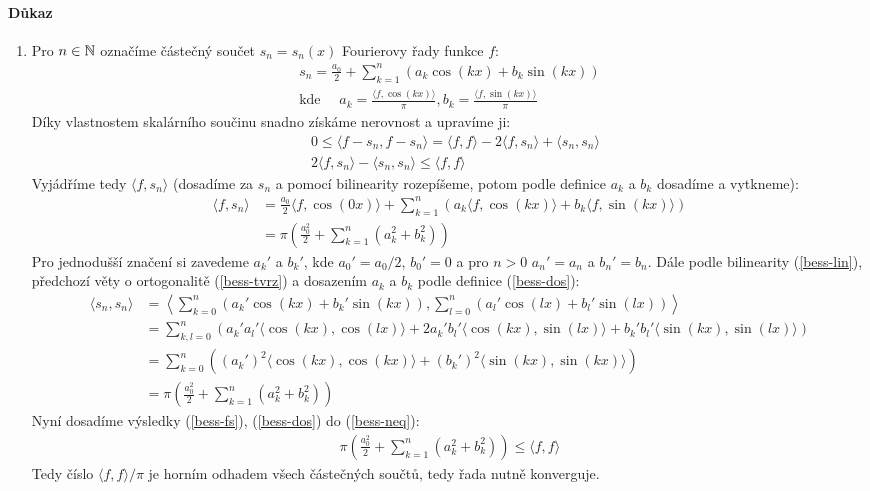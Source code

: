 \documentclass[a4paper,10pt]{article}
\begin{document}
\paragraph{Důkaz}
\begin{enumerate}
	\item Pro $n \in \mathbb{N}$ označíme částečný součet $s_n = s_n(x)$ Fourierovy řady
	funkce $f$:
	\begin{align}
		s_n = \frac{a_0}{2} + \sum_{k=1}^n(a_k \cos(kx) + b_k\sin(kx)) \\
		\text{kde }\quad  a_k = \frac{\langle f, \cos(kx)\rangle}{\pi}, 
		b_k = \frac{\langle f, \sin(kx)\rangle}{\pi}
	\end{align}
	Díky vlastnostem skalárního součinu snadno získáme nerovnost a
	upravíme ji:
	\begin{align}
		&0 \le \langle f - s_n, f - s_n \rangle = \langle f, f \rangle - 2
		\langle f, s_n \rangle + \langle s_n, s_n \rangle \\
		\label{bess-neq}
		&2 \langle f, s_n \rangle - \langle s_n, s_n \rangle \le \langle f, f
		\rangle
	\end{align}
	Vyjádříme tedy $\langle f, s_n \rangle$ (dosadíme za $s_n$ a pomocí
	bilinearity rozepíšeme, potom podle definice $a_k$ a $b_k$ dosadíme a vytkneme):
	\begin{align}
		\langle f, s_n \rangle &= \frac{a_0}{2} \langle f, \cos(0x) \rangle +
		\sum_{k=1}^n (a_k \langle f, \cos(kx) \rangle + b_k \langle f,
		\sin(kx)\rangle) \\
		\label{bess-fs}
		&= \pi \left( \frac{a_0^2}{2} + \sum_{k=1}^n(a_k^2 + b_k^2) \right)
	\end{align}
	Pro jednodušší značení si zavedeme $a_k'$ a $b_k'$, kde $a_0' = a_0 / 2$,
	$b_0' = 0$ a pro $n > 0$ $a_n' = a_n$ a $b_n' = b_n$. 
	Dále podle bilinearity (\ref{bess-lin}), předchozí věty o ortogonalitě
	(\ref{bess-tvrz}) a dosazením $a_k$ a $b_k$ podle definice (\ref{bess-dos}):
	\begin{align}
		\langle s_n, s_n \rangle &= \left\langle
			\sum_{k=0}^n(a_k' \cos(kx) + b_k' \sin(kx)),
			\sum_{l=0}^n(a_l' \cos(lx) + b_l' \sin(lx))
		\right\rangle \\
		\label{bess-lin}
		&= \sum_{k,l=0}^n(a_k'a_l' \langle\cos(kx), \cos(lx)\rangle +
		2a_k'b_l'\langle\cos(kx),\sin(lx)\rangle +
		b_k'b_l'\langle\sin(kx),\sin(lx)\rangle) \\
		\label{bess-tvrz}
		&= \sum_{k=0}^n\left((a_k')^2\langle\cos(kx),\cos(kx)\rangle +
		(b_k')^2\langle\sin(kx),\sin(kx)\rangle\right) \\
		\label{bess-dos}
		&= \pi \left( \frac{a_0^2}{2} + \sum_{k=1}^n(a_k^2 + b_k^2) \right)
	\end{align}
	Nyní dosadíme výsledky (\ref{bess-fs}), (\ref{bess-dos}) do
	(\ref{bess-neq}):
	\begin{align}
		\pi \left( \frac{a_0^2}{2} + \sum_{k=1}^n(a_k^2 + b_k^2) \right) \le
		\langle f, f \rangle
	\end{align}
	Tedy číslo $\langle f, f\rangle / \pi$ je horním odhadem všech částečných
	součtů, tedy řada nutně konverguje.
	

\end{enumerate}
\end{document}
